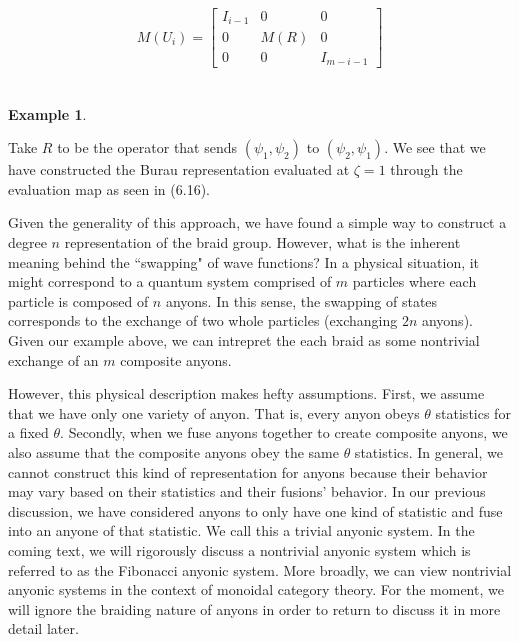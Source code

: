 \documentclass[10pt]{ucthesis}
\newtheorem{example}[definition]{Example}
\begin{document}
\begin{equation}
	\begin{aligned}
		M(U_i) = \begin{bmatrix}
						I_{i-1} & 0 & 0 \\
						0 & M(R) & 0 \\
						0 & 0 & I_{m - i - 1}
					\end{bmatrix}
	\end{aligned}
\end{equation}\\


\begin{example}\end{example}Take $R$ to be the operator that sends $(\psi_1,\psi_2)$ to $(\psi_2,\psi_1)$. We see that we have constructed the Burau representation evaluated at $\zeta=1$ through the evaluation map as seen in (6.16).

Given the generality of this approach, we have found a simple way to construct a degree $n$ representation of the braid group. However, what is the inherent meaning behind the ``swapping" of wave functions? In a physical situation, it might correspond to a quantum system comprised of $m$ particles where each particle is composed of $n$ anyons. In this sense, the swapping of states corresponds to the exchange of two whole particles (exchanging $2n$ anyons). Given our example above, we can intrepret the each braid as some nontrivial exchange of an $m$ composite anyons. 

However, this physical description makes hefty assumptions. First, we assume that we have only one variety of anyon. That is, every anyon obeys $\theta$ statistics for a fixed $\theta$. Secondly, when we fuse anyons together to create composite anyons, we also assume that the composite anyons obey the same $\theta$ statistics. In general, we cannot construct this kind of representation for anyons because their behavior may vary based on their statistics and their fusions' behavior. In our previous discussion, we have considered anyons to only have one kind of statistic and fuse into an anyone of that statistic. We call this a trivial anyonic system. In the coming text, we will rigorously discuss a nontrivial anyonic system which is referred to as the Fibonacci anyonic system. More broadly, we can view nontrivial anyonic systems in the context of monoidal category theory. For the moment, we will ignore the braiding nature of anyons in order to return to discuss it in more detail later.
\end{document}
